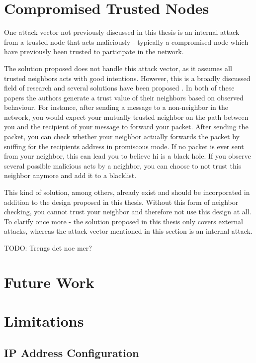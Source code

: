 \section{Compromised Trusted Nodes}
One attack vector not previously discussed in this thesis is an internal attack
from a trusted node that acts maliciously - typically a compromised node which
have previously been trusted to participate in the network.

The solution proposed does not handle this attack vector, as it assumes all
trusted neighbors acts with good intentions. However, this is a broadly
discussed field of research and several solutions have been proposed
\cite{Pirzada_McDonald} \cite{dhurandher2010network}. In both of these papers
the authors generate a trust value of their neighbors based on observed
behaviour. For instance, after sending a message to a non-neighbor in the
network, you would expect your mutually trusted neighbor on the path between
you and the recipient of your message to forward your packet. After sending the
packet, you can check whether your neighbor actually forwards the packet by
sniffing for the recipients address in promiscous mode. If no packet is ever
sent from your neighbor, this can lead you to believe hi is a black hole. If you
observe several possible malicious acts by a neighbor, you can choose to not
trust this neighbor anymore and add it to a blacklist.

This kind of solution, among others, already exist and should be incorporated in
addition to the design proposed in this thesis. Without this form of neighbor
checking, you cannot trust your neighbor and therefore not use this design at
all. To clarify once more - the solution proposed in this thesis only covers
external attacks, whereas the attack vector mentioned in this section is an
internal attack.

TODO: Trengs det noe mer?

\section{Future Work}

\section{Limitations}

\subsection{IP Address Configuration}\label{ip_address_conf}